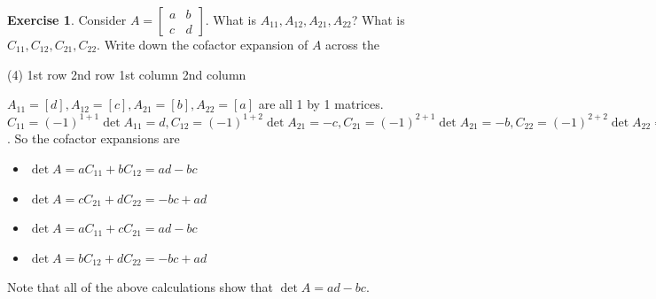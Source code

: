 \documentclass{beamer}
\theoremstyle{definition}
\newtheorem{exercise}[theorem]{Exercise}
\theoremstyle{remark}
\begin{document}
\begin{frame}[t]
\begin{exercise}
Consider $A=\begin{bmatrix}
a&b\\c&d
\end{bmatrix}$. What is $A_{11},A_{12},A_{21},A_{22}$? What is $C_{11},C_{12},C_{21},C_{22}$. Write down the cofactor expansion of $A$ across the
\begin{tasks}(4)
\task 1st row
\task 2nd row
\task 1st column
\task 2nd column
\end{tasks}
\end{exercise}
\pause
\begin{solution}
$A_{11}=[d],A_{12}=[c],A_{21}=[b],A_{22}=[a]$ are all 1 by 1 matrices. $C_{11}=(-1)^{1+1}\det A_{11}=d,C_{12}=(-1)^{1+2}\det A_{21}=-c,C_{21}=(-1)^{2+1}\det A_{21}=-b,C_{22}=(-1)^{2+2}\det A_{22}=a$. So the cofactor expansions are\pause
\begin{itemize}
\item $\det A=aC_{11}+bC_{12}=ad-bc$\pause
\item $\det A=cC_{21}+dC_{22}=-bc+ad$\pause
\item $\det A=aC_{11}+cC_{21}=ad-bc$\pause
\item $\det A=bC_{12}+dC_{22}=-bc+ad$
\end{itemize}\pause
Note that all of the above calculations show that $\det A=ad-bc$.
\end{solution}
\end{frame}


\end{document}
